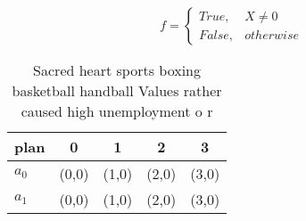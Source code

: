 \documentclass[a4paper]{article}
\begin{document}
\begin{equation}   f =
\begin{cases} True, & X \neq 0\\
False, & otherwise
\end{cases}
\end{equation}

\begin{table}
\begin{adjustbox}{width=0.5\columnwidth}
\begin{tabular}{|l|l|l|l|l|}
\hline
\textbf{plan} & \multicolumn{1}{c|}{\textbf{0}} & \multicolumn{1}{c|}{\textbf{1}} & \multicolumn{1}{c|}{\textbf{2}} & \multicolumn{1}{c|}{\textbf{3}} \\ \hline
\textbf{$a_0$}  & (0,0) & (1,0) & (2,0) & (3,0) \\ \hline
\textbf{$a_1$}  & (0,0) & (1,0) & (2,0) & (3,0) \\ \hline
\end{tabular}
\end{adjustbox}
\caption{Sacred heart sports boxing basketball handball Values rather caused high unemployment o r
}
\end{table}
\end{document}
